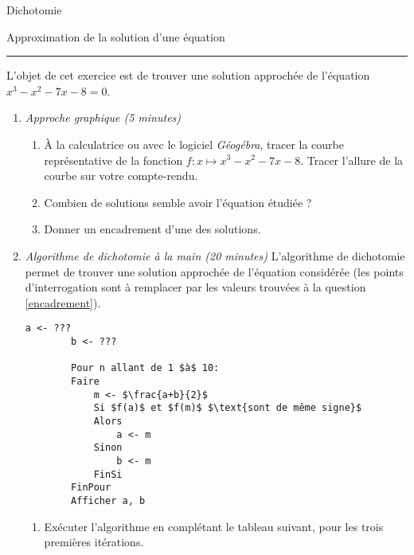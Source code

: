 \documentclass{article}
\begin{document}
\begin{center}
    {\LARGE Dichotomie\\}

    \Large Approximation de la solution d'une équation
\hrule
\end{center}

L'objet de cet exercice est de trouver une solution approchée de l'équation $x^3-x^2-7x-8=0$.

\begin{enumerate}
    \item \emph{Approche graphique (5 minutes)}
        \begin{enumerate}
            \item À la calculatrice ou avec le logiciel \emph{Géogébra}, tracer la courbe représentative de la fonction $f:x\mapsto x^3-x^2-7x-8$. Tracer l'allure de la courbe sur votre compte-rendu.
            \item Combien de solutions semble avoir l'équation étudiée ?
            \item \label{encadrement} Donner un encadrement d'une des solutions.
        \end{enumerate}
    \item \emph{Algorithme de dichotomie à la main (20 minutes)}\label{main} L'algorithme de dichotomie permet de trouver une solution approchée de l'équation considérée (les points d'interrogation sont à remplacer par les valeurs trouvées à la question \ref{encadrement}).

        \begin{lstlisting}[language=naturel,frame=lines,mathescape=true]
        a <- ???
        b <- ???

        Pour n allant de 1 $à$ 10:
        Faire
            m <- $\frac{a+b}{2}$
            Si $f(a)$ et $f(m)$ $\text{sont de même signe}$
            Alors
                a <- m
            Sinon
                b <- m
            FinSi
        FinPour
        Afficher a, b
        \end{lstlisting}
        \begin{enumerate}
            \item Exécuter l'algorithme en complétant le tableau suivant, pour les trois premières itérations.


\end{enumerate}
\end{enumerate}
\end{document}
